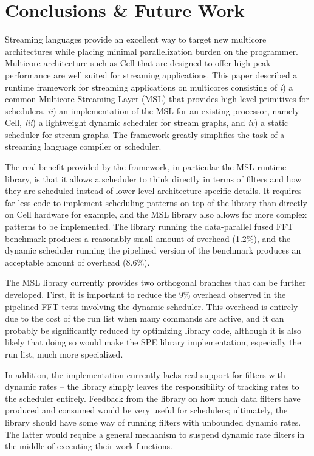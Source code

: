 \section{Conclusions \& Future Work}\label{ch:conc}

Streaming languages provide an excellent way to
target new multicore architectures while placing minimal
parallelization burden on the programmer. Multicore architecture such
as Cell that are designed to offer high peak performance are well
suited for streaming applications. This paper described a runtime
framework for streaming applications on multicores consisting of
\emph{i}) a common Multicore Streaming Layer (MSL) that provides
high-level primitives for schedulers, \emph{ii}) an implementation
of the MSL for an existing processor, namely Cell, \emph{iii}) a
lightweight dynamic scheduler for stream graphs, and \emph{iv}) a
static scheduler for stream graphs. The framework greatly
simplifies the task of a streaming language compiler or scheduler.

The real benefit provided by the framework, in particular the MSL
runtime library, is that it allows a scheduler to think directly in
terms of filters and how they are scheduled instead of lower-level
architecture-specific details. It requires far less code to implement
scheduling patterns on top of the library than directly on Cell
hardware for example, and the MSL library also allows far more complex
patterns to be implemented. The library running the data-parallel
fused FFT benchmark produces a reasonably small amount of overhead
(1.2\%), and the dynamic scheduler running the pipelined version of
the benchmark produces an acceptable amount of overhead (8.6\%).

The MSL library currently provides two orthogonal branches that can be
further developed. First, it is important to reduce the 9\% overhead
observed in the pipelined FFT tests involving the dynamic
scheduler. This overhead is entirely due to the cost of the run list
when many commands are active, and it can probably be significantly
reduced by optimizing library code, although it is also likely that
doing so would make the SPE library implementation, especially the run
list, much more specialized.

In addition, the implementation currently lacks real support for
filters with dynamic rates -- the library simply leaves the
responsibility of tracking rates to the scheduler entirely. Feedback
from the library on how much data filters have produced and consumed
would be very useful for schedulers; ultimately, the library should
have some way of running filters with unbounded dynamic rates. The
latter would require a general mechanism to suspend dynamic rate
filters in the middle of executing their work functions.

